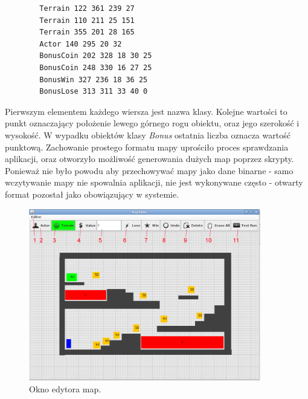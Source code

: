 \begin{par}
\begin{par}
	\begin{lstlisting}
		Terrain 122 361 239 27
		Terrain 110 211 25 151
		Terrain 355 201 28 165
		Actor 140 295 20 32
		BonusCoin 202 328 18 30 25
		BonusCoin 248 330 16 27 25
		BonusWin 327 236 18 36 25
		BonusLose 313 311 33 40 0
	\end{lstlisting}

	Pierwszym elementem każdego wiersza jest nazwa klasy.
	Kolejne wartości to punkt oznaczający położenie lewego górnego rogu obiektu, oraz jego szerokość i wysokość.
	W wypadku obiektów klasy \textit{Bonus} ostatnia liczba oznacza wartość punktową. 
	Zachowanie prostego formatu mapy uprościło proces sprawdzania aplikacji, oraz otworzyło możliwość generowania dużych map poprzez skrypty.
	Ponieważ nie było powodu aby przechowywać mapy jako dane binarne - samo wczytywanie mapy nie spowalnia aplikacji, nie jest wykonywane często - otwarty format pozostał jako obowiązujący w systemie.
\end{par}

		\begin{figure}[!h]
		\centering
		\includegraphics[width=4in]{obrazki/map_editor.png}
		\caption{Okno edytora map.}
		\label{fig:map_editor}
	\end{figure}
\end{par}

